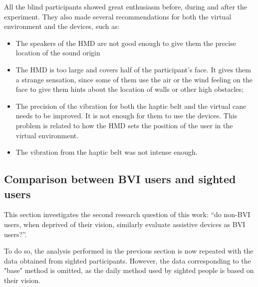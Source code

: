 All the blind participants showed great enthusiasm before, during and after the experiment. They also made several recommendations for both the virtual environment and the devices, such as:

\begin{itemize}
    \item The speakers of the HMD are not good enough to give them the precise location of the sound origin
    \item The HMD is too large and covers half of the participant's face. It gives them a strange sensation, since some of them use the air or the wind feeling on the face to give them hints about the location of walls or other high obstacles;
    \item The precision of the vibration for both the haptic belt and the virtual cane needs to be improved. It is not enough for them to use the devices. This problem is related to how the HMD sets the position of the user in the virtual environment. \\    
    \item The vibration from the haptic belt was not intense enough.
\end{itemize}

\subsection{Comparison between BVI users and sighted users}
\label{sec:results_obj_2}

This section investigates the second research question of this work: “do non-BVI users, when deprived of their vision, similarly evaluate assistive devices as BVI users?”. 

To do so, the analysis performed in the previous section is now repeated with the data obtained from sighted participants. However, the data corresponding to the "base" method is omitted, as the daily method used by sighted people is based on their vision.

%





